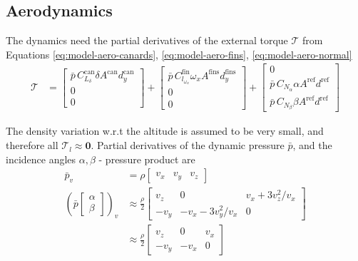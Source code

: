 \subsection{Aerodynamics}
\label{sec:jacobians-aero}
The dynamics need the partial derivatives of the external torque $\mathcal{T}$ from Equations \ref{eq:model-aero-canards}, \ref{eq:model-aero-fins}, \ref{eq:model-aero-normal}
\begin{align}
    \mathcal{T} &=
    \begin{bmatrix} \bar p \, C^\text{can}_{L_\delta} \delta A^\text{can} d^\text{can}_y \\ 0 \\ 0 \end{bmatrix} 
    + 
    \begin{bmatrix} \bar p \, C^\text{fin}_{l_{\omega_x}} \omega_x A^\text{fins} d^\text{fins}_y \\ 0 \\ 0 \end{bmatrix} 
    +
    \begin{bmatrix} 
    0 \\
    \bar p \, C_{N_\alpha} \alpha A^\text{ref} d^\text{ref} \\
    \bar p \, C_{N_\beta} \beta A^\text{ref} d^\text{ref}
    \end{bmatrix} 
\end{align}

The density variation w.r.t the altitude is assumed to be very small, and therefore all $\mathcal{T}_l \approx \bm 0$. 
Partial derivatives of the dynamic pressure $\bar p$, and the incidence angles $\alpha, \beta$ - pressure product are
\begin{align}
    \bar p_v &= \rho \begin{bmatrix}
        v_x & v_y & v_z
    \end{bmatrix} 
    \\
    \left( \bar p \begin{bmatrix}\alpha \\ \beta\end{bmatrix} \right)_v &\approx \frac{\rho}{2} 
    \begin{bmatrix}
        v_z & 0 & v_x + 3v_z^2/v_x \\
        - v_y & -v_x - 3v_y^2/v_x & 0 
    \end{bmatrix}
    \\
    &\approx
    \frac{\rho}{2} 
    \begin{bmatrix}
        v_z & 0 & v_x \\
        -v_y & -v_x & 0 
    \end{bmatrix}
\end{align}

